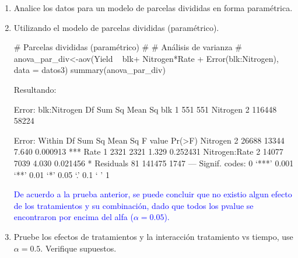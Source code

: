 \documentclass[a4paper,12pt]{article}
\begin{document}
\begin{enumerate}[label=\textbf{\alph*})]
\item Analice los datos para un modelo de parcelas divididas en forma paramétrica.
\item Utilizando el modelo de parcelas divididas (paramétrico).
	\begin{MyVerbatim}
# Parcelas divididas (paramétrico) #
# Análisis de varianza #
anova_par_div<-aov(Yield ~ blk+ Nitrogen*Rate + 
Error(blk:Nitrogen), data = datos3)
summary(anova_par_div)
	\end{MyVerbatim}
Resultando:
	\begin{MyVerbatim}
Error: blk:Nitrogen
Df Sum Sq Mean Sq
blk       1    551     551
Nitrogen  2 116448   58224

Error: Within
Df Sum Sq Mean Sq F value   Pr(>F)    
Nitrogen       2  26688   13344   7.640 0.000913 ***
Rate           1   2321    2321   1.329 0.252431    
Nitrogen:Rate  2  14077    7039   4.030 0.021456 *  
Residuals     81 141475    1747                     
---
Signif. codes:  0 ‘***’ 0.001 ‘**’ 0.01 ‘*’ 0.05 ‘.’ 0.1 ‘ ’ 1
	\end{MyVerbatim}
\textcolor{blue}{De acuerdo a la prueba anterior, se puede concluir que no existio algun efecto de los tratamientos y su combinación, dado que todos los pvalue se encontraron por encima del alfa (\(\alpha=0.05\)).}

\item Pruebe los efectos de tratamientos y la interacción tratamiento vs tiempo, use \(\alpha=0.5\). Verifique supuestos.


\end{enumerate}
\end{document}
